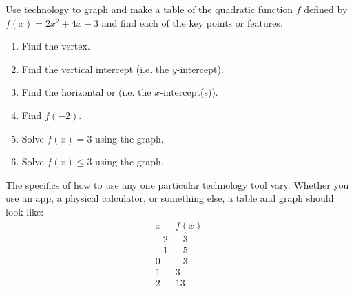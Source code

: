 \documentclass{ximera}
\begin{document}
      
 \begin{example}
          Use technology to graph and make a table of the quadratic function $f$ defined by
          $f(x)=2x^2+4x-3$ and find each of the key points or features.
\begin{enumerate}
                \item Find the vertex.
                \item Find the vertical intercept  (i.e. the $y$-intercept).
                       \item Find the horizontal or (i.e. the $x$-intercept(s)).
               \item  Find $f(-2)$.
      \item Solve $f(x)=3$ using the graph.
           \item Solve $f(x)\le 3$ using the graph.
        \end{enumerate}
\begin{explanation}
           The specifics of how to use any one particular technology tool vary.
            Whether you use an app, a physical calculator,
            or something else, a table and graph should look like:\\
  $$
  \begin{array}{cc}
x & f(x) \\
\hline
-2 & -3 \\
-1 & -5 \\
 0 & -3 \\
 1 &  3 \\
 2 & 13 \\
  \end{array}
  $$


\end{explanation}
\end{example}
\end{document}
